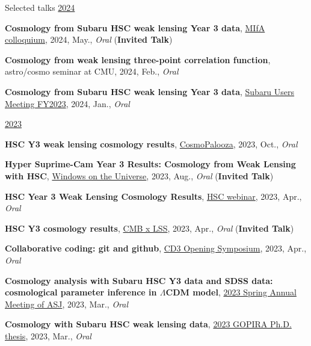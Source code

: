 \begin{rSection}{Selected talks}
\underline{2024}
\begin{etaremune}
\setcounter{enumi}{34}
\item \textbf{Cosmology from Subaru HSC weak lensing Year 3 data}, \href{https://cse.umn.edu/physics/minnesota-institute-astrophysics-mifa-colloquium}{MIfA colloquium}, 2024, May., \textit{Oral} (\textbf{Invited Talk})
\item \textbf{Cosmology from weak lensing three-point correlation function}, astro/cosmo seminar at CMU, 2024, Feb., \textit{Oral}
\item \textbf{Cosmology from Subaru HSC weak lensing Year 3 data}, \href{https://www.subarutelescope.org/Science/SubaruUM/SubaruUM2023/index.html}{Subaru Users Meeting FY2023}, 2024, Jan., \textit{Oral}
\end{etaremune}

\underline{2023}
\begin{etaremune}
\setcounter{enumi}{31}
\item \textbf{HSC Y3 weak lensing cosmology results}, \href{http://vietnam.in2p3.fr/2023/windows/index.html}{CosmoPalooza}, 2023, Oct., \textit{Oral}
\item \textbf{Hyper Suprime-Cam Year 3 Results: Cosmology from Weak Lensing with HSC}, \href{http://vietnam.in2p3.fr/2023/windows/index.html}{Windows on the Universe}, 2023, Aug., \textit{Oral} (\textbf{Invited Talk})
\item \textbf{HSC Year 3 Weak Lensing Cosmology Results}, \href{https://hsc-release.mtk.nao.ac.jp/doc/index.php/wly3/}{HSC webinar}, 2023, Apr., \textit{Oral}
\item \textbf{HSC Y3 cosmology results}, \href{https://www2.yukawa.kyoto-u.ac.jp/~cmb-lss/index.php}{CMB x LSS}, 2023, Apr., \textit{Oral} (\textbf{Invited Talk})
\item \textbf{Collaborative coding: git and github}, \href{https://cd3.ipmu.jp/opening/}{CD3 Opening Symposium}, 2023, Apr., \textit{Oral}
\item \textbf{Cosmology analysis with Subaru HSC Y3 data and SDSS data: cosmological parameter inference in $\Lambda$CDM model}, \href{https://www.asj.or.jp/nenkai/archive/2023a/pdf/U20a.pdf}{2023 Spring Annual Meeting of ASJ}, 2023, Mar., \textit{Oral}
\item \textbf{Cosmology with Subaru HSC weak lensing data}, \href{http://gopira.jp/Dthesis2022/program.html}{2023 GOPIRA Ph.D. thesis}, 2023, Mar., \textit{Oral}
\end{etaremune}


\end{rSection}
